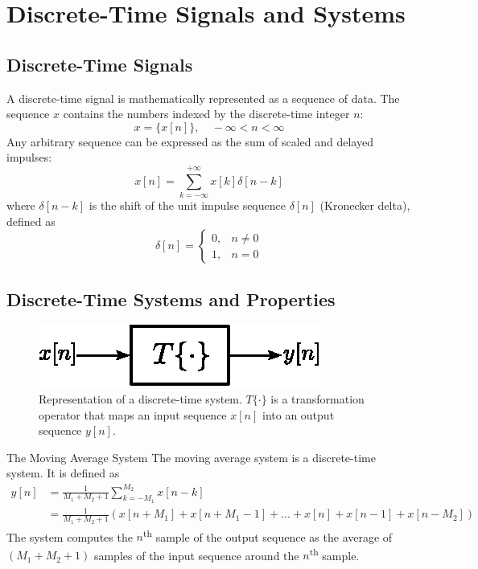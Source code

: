 \section{Discrete-Time Signals and Systems}
\subsection{Discrete-Time Signals}
A discrete-time signal is mathematically represented
as a sequence of data. The
sequence $x$ contains the numbers indexed by
the discrete-time integer $n$:
\[
    x = \{ x[n] \}, \quad -\infty < n < \infty
\]
Any arbitrary sequence can be expressed as the sum of scaled and delayed impulses:
\[
    x[n] = \sum_{k=-\infty}^{+\infty} x[k] \delta[n-k]
\]
where $\delta[n-k]$ is the shift of the unit impulse sequence $\delta[n]$ (Kronecker delta), defined as
\[
    \delta[n] = 
    \begin{cases}
        0,  & n \neq 0 \\
        1,  & n = 0
    \end{cases}
\]

\subsection{Discrete-Time Systems and Properties}
\begin{figure}[H]
    \centering
    \includegraphics[width=.4\textwidth]{images/discrete-time-system.eps}
    \caption{Representation of a discrete-time system. $T\{\cdot\}$ is a transformation operator that maps an input sequence $x[n]$ into an output sequence $y[n]$.}
    \label{fig:dt_sys}
\end{figure}

\begin{ex}{The Moving Average System}
The moving average system is a discrete-time system. It is defined as
\begin{align*}
    y[n] 
    & = \frac{1}{M_1 + M_2 + 1} \sum_{k=-M_1}^{M_2} x[n-k] \\
    & = \frac{1}{M_1 + M_2 + 1} (x[n+M_1] + x[n+M_1 -1] + ... + x[n] + x[n-1] + x[n-M_2])
\end{align*}
The system computes the $n$\textsuperscript{th} sample of the output sequence as the average of $(M_1+M_2+1)$ samples of the input sequence around the $n$\textsuperscript{th} sample.
\end{ex}
